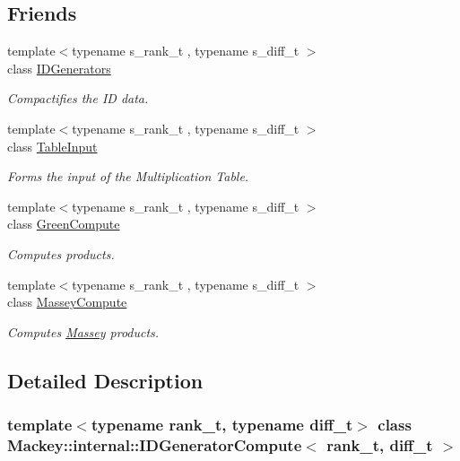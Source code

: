\subsection*{Friends}
\begin{DoxyCompactItemize}
\item 
{\footnotesize template$<$typename s\+\_\+rank\+\_\+t , typename s\+\_\+diff\+\_\+t $>$ }\\class \hyperlink{classMackey_1_1internal_1_1IDGeneratorCompute_ace5d731edf582f083830a938882efcf4}{I\+D\+Generators}
\begin{DoxyCompactList}\small\item\em Compactifies the ID data. \end{DoxyCompactList}\item 
{\footnotesize template$<$typename s\+\_\+rank\+\_\+t , typename s\+\_\+diff\+\_\+t $>$ }\\class \hyperlink{classMackey_1_1internal_1_1IDGeneratorCompute_aa9b93b7c7f692b237593457fa7dc78a8}{Table\+Input}
\begin{DoxyCompactList}\small\item\em Forms the input of the Multiplication Table. \end{DoxyCompactList}\item 
{\footnotesize template$<$typename s\+\_\+rank\+\_\+t , typename s\+\_\+diff\+\_\+t $>$ }\\class \hyperlink{classMackey_1_1internal_1_1IDGeneratorCompute_a85de7c4aeeee34981e2020c2f9ddd3e2}{Green\+Compute}
\begin{DoxyCompactList}\small\item\em Computes products. \end{DoxyCompactList}\item 
{\footnotesize template$<$typename s\+\_\+rank\+\_\+t , typename s\+\_\+diff\+\_\+t $>$ }\\class \hyperlink{classMackey_1_1internal_1_1IDGeneratorCompute_af259bfb9b4dced17104ac8fbb697355c}{Massey\+Compute}
\begin{DoxyCompactList}\small\item\em Computes \hyperlink{classMackey_1_1Massey}{Massey} products. \end{DoxyCompactList}\end{DoxyCompactItemize}


\subsection{Detailed Description}
\subsubsection*{template$<$typename rank\+\_\+t, typename diff\+\_\+t$>$\newline
class Mackey\+::internal\+::\+I\+D\+Generator\+Compute$<$ rank\+\_\+t, diff\+\_\+t $>$}

